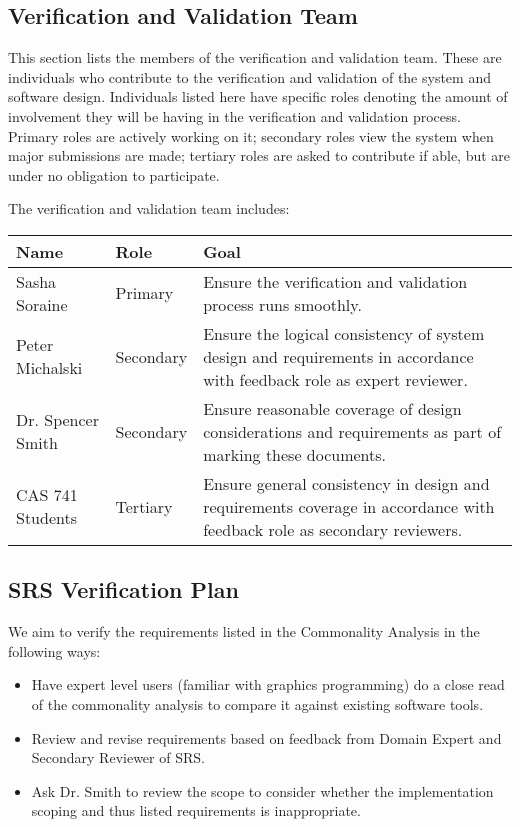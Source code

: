 \documentclass[12pt, titlepage]{article}
\begin{document}
\subsection{Verification and Validation Team}
This section lists the members of the verification and validation team. These 
are individuals who contribute to the verification and validation of the system 
and software design. Individuals listed here have specific roles denoting the 
amount of involvement they will be having in the verification and validation 
process. Primary roles are actively working on it; secondary roles view the 
system when major submissions are made; tertiary roles are asked to contribute 
if able, but are under no obligation to participate.

The verification and validation team includes:

\begin{table}[h]
	\begin{tabular}{|l|l|p{9cm}|}
		\hline
		\textbf{Name} & \textbf{Role} & \textbf{Goal} \\
		\hline
		Sasha Soraine & Primary & Ensure the verification and validation 
		process runs smoothly.\\
		Peter Michalski & Secondary & Ensure the logical consistency of system 
		design and requirements in accordance with feedback role as expert 
		reviewer. \\
		Dr. Spencer Smith & Secondary & Ensure reasonable coverage of design 
		considerations and requirements as part of marking these documents. \\
		CAS 741 Students & Tertiary & Ensure general consistency in design and 
		requirements coverage in accordance with feedback role as secondary 
		reviewers.\\
		\hline
	\end{tabular}
\end{table}

\subsection{SRS Verification Plan}

We aim to verify the requirements listed in the Commonality Analysis in the 
following ways:

\begin{itemize}
	\item Have expert level users (familiar with graphics programming) do a 
	close read of the commonality analysis to compare it against existing 
	software tools.
	\item Review and revise requirements based on feedback from Domain Expert 
	and Secondary Reviewer of SRS.
	\item Ask Dr. Smith to review the scope to consider whether the 
	implementation scoping and thus listed requirements is inappropriate.
\end{itemize}
\end{document}
